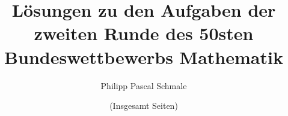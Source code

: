 \documentclass{article}
\date{(Insgesamt \pageref{LastPage} Seiten)}
\author{Philipp Pascal Schmale}
\title{Lösungen zu den Aufgaben der zweiten Runde des 50sten Bundeswettbewerbs Mathematik}
\begin{document}
\maketitle

\tableofcontents



\pagebreak


\pagebreak


\pagebreak


\pagebreak

\end{document}

